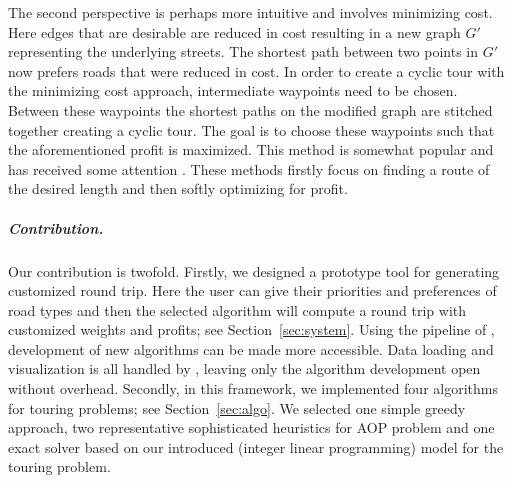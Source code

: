 \documentclass[sigconf,natbib=false]{acmart}
\begin{document}
The second perspective is perhaps more intuitive and involves minimizing cost. 
Here edges that are desirable are reduced in cost resulting in a new graph $G'$ representing the underlying streets. 
The shortest path between two points in $G'$ now prefers roads that were reduced in cost.
In order to create a cyclic tour with the minimizing cost approach, intermediate waypoints need to be chosen. Between these waypoints the shortest paths on the modified graph are stitched together creating a cyclic tour. The goal is to choose these waypoints such that the aforementioned profit is maximized.
This method is somewhat popular and has received some attention \cite{jogging, stroobant2018generating}. These methods firstly focus on finding a route of the desired length and then softly optimizing for profit.



\subparagraph*{\textbf{Contribution.}}
Our contribution is twofold. Firstly, we designed a prototype tool \tM for generating customized round trip. Here the user can give their priorities and preferences of road types and then the selected algorithm will compute a round trip with customized weights and profits; see Section~\ref{sec:system}.
Using the pipeline of \tM, development of new algorithms can be made more accessible. Data loading and visualization is all handled by \tM, leaving only the algorithm development open without overhead. 
Secondly, in this framework, we implemented four algorithms for touring problems; see Section~\ref{sec:algo}.
We selected one simple greedy approach, two representative sophisticated heuristics for AOP problem and one exact solver based on our introduced (integer linear programming) model for the touring problem.
\end{document}
